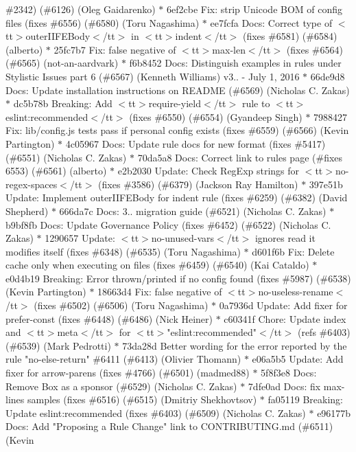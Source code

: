 \begin{DoxyItemize}
\#2342) (\#6126) (\+Oleg Gaidarenko) \texorpdfstring{$\ast$}{*} 6ef2cbe Fix\+: strip Unicode BOM of config files (fixes \#6556) (\#6580) (\+Toru Nagashima) \texorpdfstring{$\ast$}{*} ee7fcfa Docs\+: Correct type of $<$tt$>$outer\+IIFEBody$<$/tt$>$ in $<$tt$>$indent$<$/tt$>$ (fixes \#6581) (\#6584) (alberto) \texorpdfstring{$\ast$}{*} 25fc7b7 Fix\+: false negative of $<$tt$>$max-\/len$<$/tt$>$ (fixes \#6564) (\#6565) (not-\/an-\/aardvark) \texorpdfstring{$\ast$}{*} f6b8452 Docs\+: Distinguish examples in rules under Stylistic Issues part 6 (\#6567) (\+Kenneth Williams)  v3.. -\/ July 1, 2016  \texorpdfstring{$\ast$}{*} 66de9d8 Docs\+: Update installation instructions on README (\#6569) (\+Nicholas C. Zakas) \texorpdfstring{$\ast$}{*} dc5b78b Breaking\+: Add $<$tt$>$require-\/yield$<$/tt$>$ rule to $<$tt$>$eslint\+:recommended$<$/tt$>$ (fixes \#6550) (\#6554) (\+Gyandeep Singh) \texorpdfstring{$\ast$}{*} 7988427 Fix\+: lib/config.\+js tests pass if personal config exists (fixes \#6559) (\#6566) (\+Kevin Partington) \texorpdfstring{$\ast$}{*} 4c05967 Docs\+: Update rule docs for new format (fixes \#5417) (\#6551) (\+Nicholas C. Zakas) \texorpdfstring{$\ast$}{*} 70da5a8 Docs\+: Correct link to rules page (\#fixes 6553) (\#6561) (alberto) \texorpdfstring{$\ast$}{*} e2b2030 Update\+: Check Reg\+Exp strings for $<$tt$>$no-\/regex-\/spaces$<$/tt$>$ (fixes \#3586) (\#6379) (\+Jackson Ray Hamilton) \texorpdfstring{$\ast$}{*} 397e51b Update\+: Implement outer\+IIFEBody for indent rule (fixes \#6259) (\#6382) (\+David Shepherd) \texorpdfstring{$\ast$}{*} 666da7c Docs\+: 3.. migration guide (\#6521) (\+Nicholas C. Zakas) \texorpdfstring{$\ast$}{*} b9bf8fb Docs\+: Update Governance Policy (fixes \#6452) (\#6522) (\+Nicholas C. Zakas) \texorpdfstring{$\ast$}{*} 1290657 Update\+: $<$tt$>$no-\/unused-\/vars$<$/tt$>$ ignores read it modifies itself (fixes \#6348) (\#6535) (\+Toru Nagashima) \texorpdfstring{$\ast$}{*} d601f6b Fix\+: Delete cache only when executing on files (fixes \#6459) (\#6540) (\+Kai Cataldo) \texorpdfstring{$\ast$}{*} e0d4b19 Breaking\+: Error thrown/printed if no config found (fixes \#5987) (\#6538) (\+Kevin Partington) \texorpdfstring{$\ast$}{*} 18663d4 Fix\+: false negative of $<$tt$>$no-\/useless-\/rename$<$/tt$>$ (fixes \#6502) (\#6506) (\+Toru Nagashima) \texorpdfstring{$\ast$}{*} 0a7936d Update\+: Add fixer for prefer-\/const (fixes \#6448) (\#6486) (\+Nick Heiner) \texorpdfstring{$\ast$}{*} c60341f Chore\+: Update index and $<$tt$>$meta$<$/tt$>$ for $<$tt$>$"{}eslint\+:recommended"{}$<$/tt$>$ (refs \#6403) (\#6539) (\+Mark Pedrotti) \texorpdfstring{$\ast$}{*} 73da28d Better wording for the error reported by the rule "{}no-\/else-\/return"{} \#6411 (\#6413) (\+Olivier Thomann) \texorpdfstring{$\ast$}{*} e06a5b5 Update\+: Add fixer for arrow-\/parens (fixes \#4766) (\#6501) (madmed88) \texorpdfstring{$\ast$}{*} 5f8f3e8 Docs\+: Remove Box as a sponsor (\#6529) (\+Nicholas C. Zakas) \texorpdfstring{$\ast$}{*} 7dfe0ad Docs\+: fix max-\/lines samples (fixes \#6516) (\#6515) (\+Dmitriy Shekhovtsov) \texorpdfstring{$\ast$}{*} fa05119 Breaking\+: Update eslint\+:recommended (fixes \#6403) (\#6509) (\+Nicholas C. Zakas) \texorpdfstring{$\ast$}{*} e96177b Docs\+: Add "{}Proposing a Rule Change"{} link to CONTRIBUTING.\+md (\#6511) (\+Kevin 
\end{DoxyItemize}
